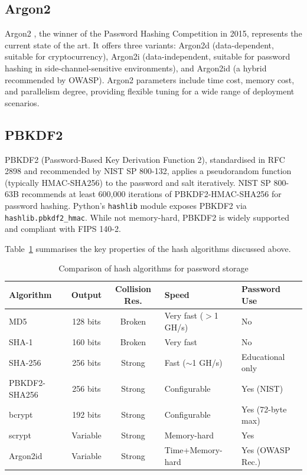 \subsection{Argon2}
\label{sec:lit_argon2}

Argon2 \cite{biryukov2016}, the winner of the Password Hashing Competition in 2015, represents the current state of the art. It offers three variants: Argon2d (data-dependent, suitable for cryptocurrency), Argon2i (data-independent, suitable for password hashing in side-channel-sensitive environments), and Argon2id (a hybrid recommended by OWASP). Argon2 parameters include time cost, memory cost, and parallelism degree, providing flexible tuning for a wide range of deployment scenarios.

\subsection{PBKDF2}
\label{sec:lit_pbkdf2}

PBKDF2 (Password-Based Key Derivation Function 2), standardised in RFC 2898 and recommended by NIST SP 800-132, applies a pseudorandom function (typically HMAC-SHA256) to the password and salt iteratively. NIST SP 800-63B recommends at least 600,000 iterations of PBKDF2-HMAC-SHA256 for password hashing. Python's \texttt{hashlib} module exposes PBKDF2 via \texttt{hashlib.pbkdf2\_hmac}. While not memory-hard, PBKDF2 is widely supported and compliant with FIPS 140-2.

Table~\ref{tab:algo_comparison} summarises the key properties of the hash algorithms discussed above.

\begin{table}[H]
\centering
\caption{Comparison of hash algorithms for password storage}
\label{tab:algo_comparison}
\small
\begin{tabularx}{\textwidth}{|p{3.2cm}|c|c|p{2.8cm}|X|}
\hline
\textbf{Algorithm} & \textbf{Output} & \textbf{Collision Res.} & \textbf{Speed} & \textbf{Password Use} \\\hline
MD5       & 128 bits  & Broken          & Very fast ($>$1 GH/s) & No \\\hline
SHA-1     & 160 bits  & Broken          & Very fast             & No \\\hline
SHA-256   & 256 bits  & Strong          & Fast ($\sim$1 GH/s)   & Educational only \\\hline
PBKDF2-SHA256 & 256 bits & Strong       & Configurable          & Yes (NIST) \\\hline
bcrypt    & 192 bits  & Strong          & Configurable          & Yes (72-byte max) \\\hline
scrypt    & Variable  & Strong          & Memory-hard           & Yes \\\hline
Argon2id  & Variable  & Strong          & Time+Memory-hard      & Yes (OWASP Rec.) \\\hline
\end{tabularx}
\end{table}

